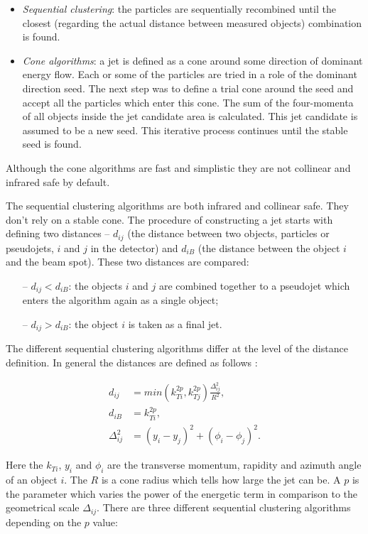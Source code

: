 \begin{itemize}
 \item \textit{Sequential clustering}: the particles are sequentially recombined until the closest (regarding the actual distance between measured
 objects) combination is found.
 \item \textit{Cone algorithms}: a jet is defined as a cone around some direction of dominant energy flow. Each or some of the particles are tried 
 in a role of the dominant direction seed. The next step was to define a trial cone around the seed and accept all the particles which enter this cone.
 The sum of the four-momenta of all objects inside the jet candidate area is calculated. This jet candidate is assumed to be a new seed. This iterative process continues
 until the stable seed is found.
\end{itemize}

Although the cone algorithms are fast and simplistic they are not collinear and infrared safe by default.

The sequential clustering algorithms are both infrared and collinear safe. They don't rely on a stable cone. The procedure of constructing
a jet starts with defining two distances -- $d_{ij}$ (the distance between two objects, particles or pseudojets, $i$ and $j$ in the detector) and $d_{iB}$ (the distance between the object $i$
and the beam spot). These two distances are compared:

\begin{itemize}
 \item [--] $d_{ij} < d_{iB}$: the objects $i$ and $j$ are combined together to a pseudojet which enters the algorithm again as a single object;
 \item [--] $d_{ij} > d_{iB}$: the object $i$ is taken as a final jet.
\end{itemize}

The different sequential clustering algorithms differ at the level of the distance definition. In general the distances are defined as follows \cite{Cacciari:2008gp}:

\begin{align}
 d_{ij} & = min(k_{Ti}^{2p}, k_{Tj}^{2p}) \frac{\Delta_{ij}^{2}}{R^{2}},\label{eq:ktDist} \\
 d_{iB} & = k_{Ti}^{2p}, \\
 \Delta_{ij}^{2} & = (y_{i} - y_{j})^{2} + (\phi_{i} - \phi_{j})^{2}.
\end{align}

Here the $k_{Ti}$, $y_{i}$ and $\phi_i$ are the transverse momentum, rapidity and azimuth angle of an object $i$. The $R$ is a cone radius which tells 
how large the jet can be. A $p$ is the parameter which varies the power of the energetic term in comparison to the geometrical scale $\Delta_{ij}$.
There are three different sequential clustering algorithms depending on the $p$ value:

